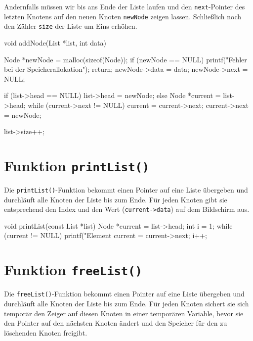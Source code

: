 Andernfalls müssen wir bis ans Ende der Liste laufen und den
\texttt{next}-Pointer des letzten Knotens auf den neuen Knoten
\texttt{newNode} zeigen lassen. Schließlich noch den Zähler
\texttt{size} der Liste um Eins erhöhen.

\begin{codebox}[lang=c, fontsize=\small]
void addNode(List *list, int data) {
    Node *newNode = malloc(sizeof(Node));
    if (newNode == NULL) {
        printf("Fehler bei der Speicherallokation\n");
        return;
    }
    newNode->data = data;
    newNode->next = NULL;

    if (list->head == NULL) {
        list->head = newNode;
    } else {
        Node *current = list->head;
        while (current->next != NULL) {
            current = current->next;
        }
        current->next = newNode;
    }

    list->size++;
}
\end{codebox}

\section*{Funktion \texttt{printList()}}

Die \texttt{printList()}-Funktion bekommt einen Pointer auf eine Liste
übergeben und durchläuft alle Knoten der Liste bis zum Ende. Für jeden Knoten
gibt sie entsprechend den Index und den Wert (\texttt{current->data}) auf
dem Bildschirm aus.

\begin{codebox}[lang=c, fontsize=\small]
void printList(const List *list) {
    Node *current = list->head;
    int i = 1;
    while (current != NULL) {
        printf("Element %
        current = current->next;
        i++;
    }
}
\end{codebox}

\section*{Funktion \texttt{freeList()}}

Die \texttt{freeList()}-Funktion bekommt einen Pointer auf eine Liste
übergeben und durchläuft alle Knoten der Liste bis zum Ende. Für jeden Knoten
sichert sie sich temporär den Zeiger auf diesen Knoten in einer temporären
Variable, bevor sie den Pointer auf den nächsten Knoten ändert und den Speicher
für den zu löschenden Knoten freigibt.

